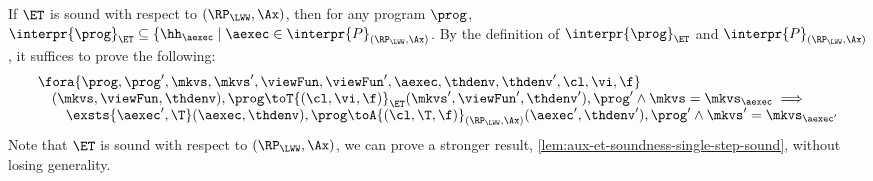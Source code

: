 If $\ET$ is sound with respect to $(\RP_{\LWW}, \Ax)$, then 
for any program $\prog$, $\interpr{\prog}_{\ET} \subseteq \{ \hh_{\aexec} \mid \aexec \in \interpr{P}_{(\RP_{\LWW}, \Ax)}$.
By the definition of \( \interpr{\prog}_{\ET} \) and \( \interpr{P}_{(\RP_{\LWW}, \Ax)} \), it suffices to prove the following:
\[
\begin{array}{@{}l@{}}
    \fora{\prog,\prog',\mkvs,\mkvs',\viewFun,\viewFun',\aexec,\thdenv,\thdenv',\cl,\vi,\f} \\
    \quad (\mkvs, \viewFun, \thdenv), \prog \toT{(\cl, \vi, \f)}_{\ET} (\mkvs', \viewFun', \thdenv'), \prog'
    \land \mkvs = \mkvs_{\aexec}
    \implies {} \\
    \qquad \exsts{\aexec',\T}
    (\aexec, \thdenv), \prog \toA{(\cl, \T, \f)}_{(\RP_{\LWW}, \Ax)} (\aexec', \thdenv'), \prog' 
    \land \mkvs' = \mkvs_{\aexec'}  
\end{array}
\]
Note that \( \ET \) is sound with respect to \( (\RP_{\LWW}, \Ax) \), we can prove a stronger result, \ie \cref{lem:aux-et-soundness-single-step-sound}, without losing generality.

